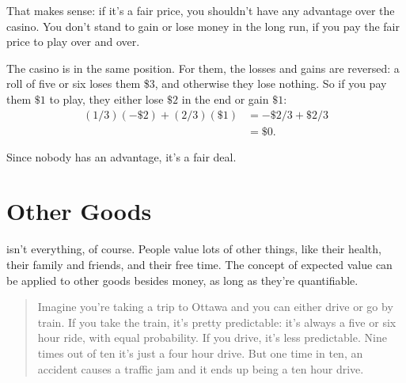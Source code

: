 \documentclass[justified]{tufte-book}
\newenvironment{problem}{\begin{quote}\normalsize}{\end{quote}}
\theoremstyle{definition}
\theoremstyle{definition}
\theoremstyle{definition}
\theoremstyle{remark}
\begin{document}
That makes sense: if it's a fair price, you shouldn't have any advantage
over the casino. You don't stand to gain or lose money in the long run,
if you pay the fair price to play over and over.

The casino is in the same position. For them, the losses and gains are
reversed: a roll of five or six loses them \$3, and otherwise they lose
nothing. So if you pay them \(\$1\) to play, they either lose \(\$2\) in
the end or gain \(\$1\): \[
  \begin{aligned}
    (1/3)(-\$2) + (2/3)(\$1) &= -\$2/3 + \$2/3\\
      &= \$0.
  \end{aligned}
\]

Since nobody has an advantage, it's a fair deal.

\hypertarget{other-goods}{%
\section{Other Goods}\label{other-goods}}

 isn't everything, of course. People value lots of
other things, like their health, their family and friends, and their
free time. The concept of expected value can be applied to other goods
besides money, as long as they're quantifiable.

\begin{problem}
Imagine you're taking a trip to Ottawa and you can either drive or go by
train. If you take the train, it's pretty predictable: it's always a
five or six hour ride, with equal probability. If you drive, it's less
predictable. Nine times out of ten it's just a four hour drive. But one
time in ten, an accident causes a traffic jam and it ends up being a ten
hour drive.
\end{problem}
\end{document}
